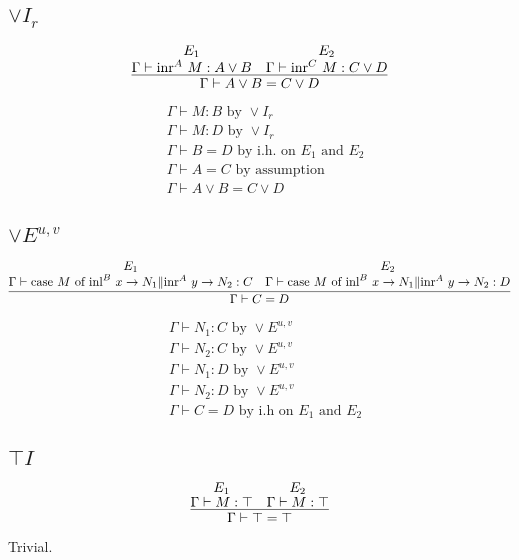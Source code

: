 \documentclass[11pt]{article}
\begin{document}
\subsection{$\vee I_r$}
\[
\infer
  {\Gamma \vdash A \vee B = C \vee D}
  {
    \deduce{\Gamma \vdash \text{inr}^A~M: A \vee B}{E_1} &
    \deduce{\Gamma \vdash \text{inr}^C~M: C \vee D}{E_2}
  }
\]


\begin{align*}
  & \Gamma \vdash M : B \text{ by } \vee I_r \\
  & \Gamma \vdash M : D \text{ by } \vee I_r \\
  & \Gamma \vdash B = D \text{ by i.h. on $E_1$ and $E_2$} \\
  & \Gamma \vdash A = C \text{ by assumption} \\
  & \Gamma \vdash A \vee B = C \vee D
\end{align*}


\subsection{$\vee E^{u,v}$}
\[
\infer
  {\Gamma \vdash C = D}
  {
    \deduce{\Gamma \vdash \text{case } M \text{ of inl}^B~x \to N_1 \| \text{inr}^A~y \to N_2 : C}{E_1} &
    \deduce{\Gamma \vdash \text{case } M \text{ of inl}^B~x \to N_1 \| \text{inr}^A~y \to N_2 : D}{E_2}
  }
\]


\begin{align*}
  & \Gamma \vdash N_1: C \text{ by } \vee E^{u,v} \\
  & \Gamma \vdash N_2: C \text{ by } \vee E^{u,v} \\
  & \Gamma \vdash N_1: D \text{ by } \vee E^{u,v} \\
  & \Gamma \vdash N_2: D \text{ by } \vee E^{u,v} \\
  & \Gamma \vdash C = D \text{ by i.h on $E_1$ and $E_2$}
\end{align*}


\subsection{$\top I$}
\[
\infer
  {\Gamma \vdash \top = \top}
  {
    \deduce{\Gamma \vdash M: \top}{E_1} &
    \deduce{\Gamma \vdash M: \top}{E_2}
  }
\]

Trivial.
\end{document}

